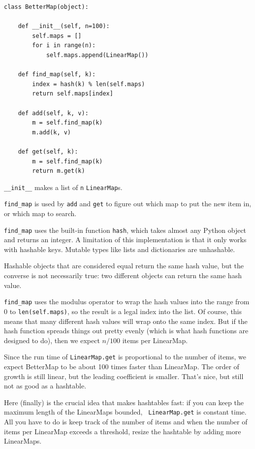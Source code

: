 \documentclass[10pt]{book}
\begin{document}
\begin{verbatim}
class BetterMap(object):

    def __init__(self, n=100):
        self.maps = []
        for i in range(n):
            self.maps.append(LinearMap())

    def find_map(self, k):
        index = hash(k) % len(self.maps)
        return self.maps[index]

    def add(self, k, v):
        m = self.find_map(k)
        m.add(k, v)

    def get(self, k):
        m = self.find_map(k)
        return m.get(k)
\end{verbatim}

\verb"__init__" makes a list of {\tt n} {\tt LinearMap}s.

\verb"find_map" is used by
{\tt add} and {\tt get}
to figure out which map to put the
new item in, or which map to search.  

\verb"find_map" uses the built-in function {\tt hash}, which takes
almost any Python object and returns an integer.  A limitation of this
implementation is that it only works with hashable keys.  Mutable
types like lists and dictionaries are unhashable.

Hashable objects that are considered equal return the same hash value,
but the converse is not necessarily true: two different objects
can return the same hash value.

\verb"find_map" uses the modulus operator to wrap the hash values
into the range from 0 to {\tt len(self.maps)}, so the result is a legal
index into the list.  Of course, this means that many different
hash values will wrap onto the same index.  But if the hash function
spreads things out pretty evenly (which is what hash functions
are designed to do), then we expect $n/100$ items per LinearMap.

Since the run time of {\tt LinearMap.get} is proportional to the
number of items, we expect BetterMap to be about 100 times faster
than LinearMap.  The order of growth is still linear, but the
leading coefficient is smaller.  That's nice, but still not
as good as a hashtable.

Here (finally) is the crucial idea that makes hashtables fast: if you
can keep the maximum length of the LinearMaps bounded, {\tt
  LinearMap.get} is constant time.  All you have to do is keep track
of the number of items and when the number of
items per LinearMap exceeds a threshold, resize the hashtable by
adding more LinearMaps.
\end{document}
